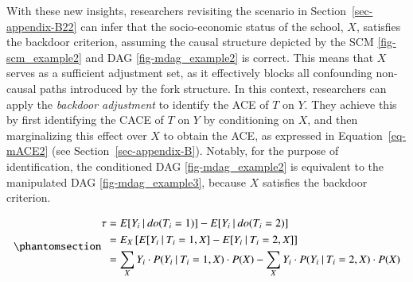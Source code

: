 \documentclass[
  authoryear,
  review,
  1p]{elsarticle}
\begin{document}
With these new insights, researchers revisiting the scenario in
Section~\ref{sec-appendix-B22} can infer that the socio-economic status
of the school, \(X\), satisfies the backdoor criterion, assuming the
causal structure depicted by the SCM \ref{fig-scm_example2} and DAG
\ref{fig-mdag_example2} is correct. This means that \(X\) serves as a
sufficient adjustment set, as it effectively blocks all confounding
non-causal paths introduced by the fork structure. In this context,
researchers can apply the \emph{backdoor adjustment} to identify the ACE
of \(T\) on \(Y\). They achieve this by first identifying the CACE of
\(T\) on \(Y\) by conditioning on \(X\), and then marginalizing this
effect over \(X\) to obtain the ACE, as expressed in
Equation~\ref{eq-mACE2} (see Section~\ref{sec-appendix-B}). Notably, for
the purpose of identification, the conditioned DAG
\ref{fig-mdag_example2} is equivalent to the manipulated DAG
\ref{fig-mdag_example3}, because \(X\) satisfies the backdoor criterion.

\begin{equation}\phantomsection\label{eq-mACE2}{
\begin{aligned}
  \tau & = E[Y_{i} \:|\:do(T_{i}=1)]- E[Y_{i} \:|\:do(T_{i}=2)] \\
  & = E_{X}\left[ E[Y_{i} \:|\:T_{i}=1, X] - E[Y_{i} \:|\:T_{i}=2, X] \right] \\
  & = \sum_{X} Y_{i} \cdot P( Y_{i} \:|\:T_{i}=1, X) \cdot P(X) - \sum_{X} Y_{i} \cdot P( Y_{i} \:|\:T_{i}=2, X) \cdot P(X)
\end{aligned}
}\end{equation}
\end{document}
